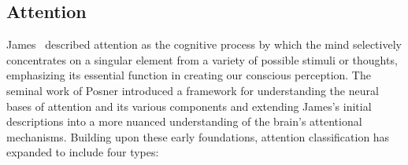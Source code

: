 
\subsection{Attention} 

James~\cite{James1890} described attention as the cognitive process by which the mind selectively concentrates on a singular element from a variety of possible stimuli or thoughts, emphasizing its essential function in creating our conscious perception. 
The seminal work of Posner \cite{posner1980orienting} 
introduced a framework for understanding the neural bases of attention and its various components and extending James's initial descriptions into a more nuanced understanding of the brain's attentional mechanisms. Building upon these early foundations, attention classification has expanded to include four types: %

